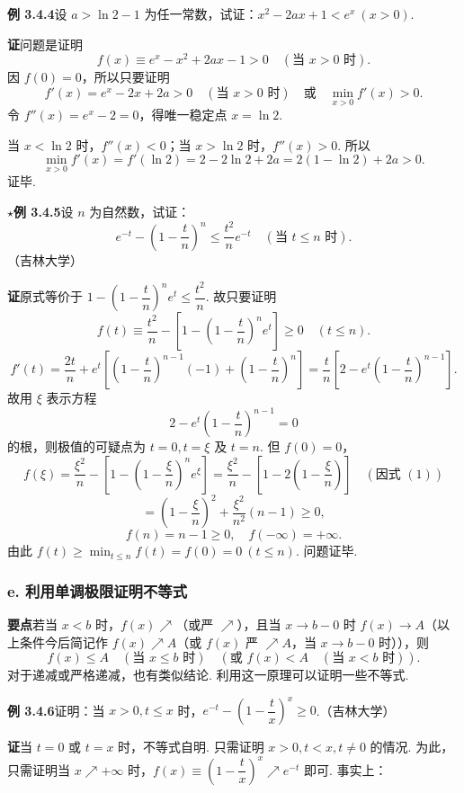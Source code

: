 \documentclass[UTF8, 12pt, fontset=fandol, oneside]{ctexart}
\begin{document}
\noindent\textbf{例 3.4.4}\quad 设 $a>\ln2-1$ 为任一常数，试证：$x^2-2ax+1<e^x\ (x>0)$.

\noindent\textbf{证}\quad 问题是证明
\[
  f(x)\equiv e^x-x^2+2ax-1>0\quad(\text{当 }x>0\text{ 时}).
\]
因 $f(0)=0$，所以只要证明
\[
  f'(x)=e^x-2x+2a>0\quad(\text{当 }x>0\text{ 时})
  \quad\text{或}\quad \min_{x>0}f'(x)>0.
\]
令 $f''(x)=e^x-2=0$，得唯一稳定点 $x=\ln2$.

当 $x<\ln2$ 时，$f''(x)<0$；当 $x>\ln2$ 时，$f''(x)>0$. 所以
\[
  \min_{x>0}f'(x)=f'(\ln2)=2-2\ln2+2a=2(1-\ln2)+2a>0.
\]
证毕.

\noindent\textbf{$\star$例 3.4.5}\quad 设 $n$ 为自然数，试证：
\[
  e^{-t}-\left(1-\frac tn\right)^n\le \frac{t^2}{n}e^{-t}\quad(\text{当 }t\le n\text{ 时}).
\]
（吉林大学）

\noindent\textbf{证}\quad 原式等价于 $1-\left(1-\dfrac tn\right)^n e^t\le \dfrac{t^2}{n}$. 故只要证明
\[
  f(t)\equiv \frac{t^2}{n}-\left[1-\left(1-\frac tn\right)^n e^t\right]\ge0\quad(t\le n).
\]
\[
  f'(t)=\frac{2t}{n}+e^t\left[\left(1-\frac tn\right)^{n-1}(-1)+\left(1-\frac tn\right)^n\right]
  =\frac tn\left[2-e^t\left(1-\frac tn\right)^{n-1}\right].
\]
故用 $\xi$ 表示方程
\[
  2-e^t\left(1-\frac tn\right)^{n-1}=0 \tag{1}
\]
的根，则极值的可疑点为 $t=0,t=\xi$ 及 $t=n$. 但 $f(0)=0$，
\[
  f(\xi)=\frac{\xi^2}{n}-\left[1-\left(1-\frac{\xi}{n}\right)^n e^\xi\right]
  =\frac{\xi^2}{n}-\left[1-2\left(1-\frac{\xi}{n}\right)\right]\quad(\text{因式 }(1))
\]
\[
  =\left(1-\frac{\xi}{n}\right)^2+\frac{\xi^2}{n^2}(n-1)\ge0,
\]
\[
  f(n)=n-1\ge0,\quad f(-\infty)=+\infty.
\]
由此 $f(t)\ge \min_{t\le n}f(t)=f(0)=0\ (t\le n)$. 问题证毕.

\subsubsection*{e. 利用单调极限证明不等式}

\noindent\textbf{要点}\quad 若当 $x<b$ 时，$f(x)\nearrow$（或严 $\nearrow$），且当 $x\to b-0$ 时 $f(x)\to A$（以上条件今后简记作 $f(x)\nearrow A$（或 $f(x)$ 严 $\nearrow A$，当 $x\to b-0$ 时）），则
\[
  f(x)\le A\quad(\text{当 }x\le b\text{ 时})\quad
  (\text{或 }f(x)<A\quad(\text{当 }x<b\text{ 时})).
\]
对于递减或严格递减，也有类似结论. 利用这一原理可以证明一些不等式.

\noindent\textbf{例 3.4.6}\quad 证明：当 $x>0,t\le x$ 时，$e^{-t}-\left(1-\dfrac tx\right)^x\ge0$.（吉林大学）

\noindent\textbf{证}\quad 当 $t=0$ 或 $t=x$ 时，不等式自明. 只需证明 $x>0,t<x,t\ne0$ 的情况. 为此，只需证明当 $x\nearrow+\infty$ 时，$f(x)\equiv\left(1-\dfrac tx\right)^x\nearrow e^{-t}$ 即可. 事实上：
\end{document}
